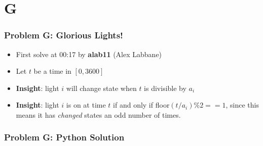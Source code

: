 \section{G}%
\label{sec:G}

\begin{frame}
  \frametitle{Problem G: Glorious Lights!}
  \begin{itemize}
    \item First solve at 00:17 by \textbf{alab11} (Alex Labbane)
    \item Let $t$ be a time in $[0, 3600]$
    \item \textbf{Insight}: light $i$ will change state when $t$ is divisible by $a_i$ \\
    \item \textbf{Insight}: light $i$ is on at time $t$ if and only if floor$(t/a_i) \% 2 == 1$,
      since this means it has \textit{changed} states an odd number of times.
  \end{itemize}
\end{frame}
\begin{frame}
  \frametitle{Problem G: Python Solution}
\end{frame}
